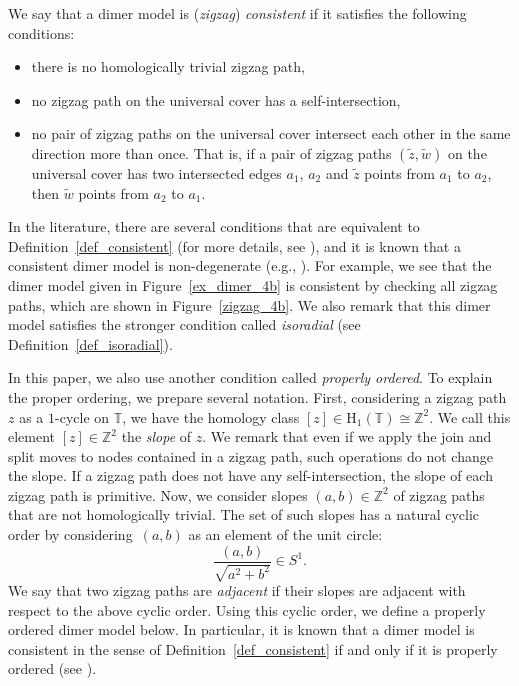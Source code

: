 \documentclass[pdftex]{sigma}%
\numberwithin{equation}{section}
\numberwithin{figure}{section}
\numberwithin{table}{section}
\newcommand{\ZZ}{\mathbb{Z}}
\newcommand{\TT}{\mathbb{T}}
\newcommand{\rmH}{\mathrm{H}}
\begin{document}
\begin{Definition}
\label{def_consistent}
We say that a dimer model is (\emph{zigzag}) \emph{consistent} if it satisfies the following conditions:
\begin{itemize}\itemsep=0pt
\item [(1)] there is no homologically trivial zigzag path,
\item [(2)] no zigzag path on the universal cover has a self-intersection,
\item [(3)] no pair of zigzag paths on the universal cover intersect each other in the same direction more than once.
That is, if a pair of zigzag paths $(\widetilde{z},\widetilde{w})$ on the universal cover has two intersected edges $a_1$, $a_2$
and $\widetilde{z}$ points from $a_1$ to $a_2$, then $\widetilde{w}$ points from $a_2$ to $a_1$.
\end{itemize}
\end{Definition}

In the literature, there are several conditions that are equivalent to Definition~\ref{def_consistent} (for more details, see \cite{Boc1,IU1}),
and it is known that a consistent dimer model is non-degenerate (e.g., \cite[Proposition~8.1]{IU2}).
For example, we see that the dimer model given in Figure~\ref{ex_dimer_4b} is consistent by checking all zigzag paths, which are shown in Figure~\ref{zigzag_4b}.
We also remark that this dimer model satisfies the stronger condition called \emph{isoradial} (see Definition~\ref{def_isoradial}).

In this paper, we also use another condition called \emph{properly ordered}.
To explain the proper ordering, we prepare several notation.
First, considering a zigzag path $z$ as a $1$-cycle on $\TT$, we have the homology class $[z]\in\rmH_1(\TT)\cong\ZZ^2$. We call this element $[z]\in\ZZ^2$ the \emph{slope} of $z$.
We remark that even if we apply the join and split moves to nodes contained in a zigzag path, such operations do not change the slope.
If a zigzag path does not have any self-intersection, the slope of each zigzag path is primitive.
Now, we consider slopes $(a,b)\in\ZZ^2$ of zigzag paths that are not homologically trivial.
The set of such slopes has a natural cyclic order by considering~$(a,b)$ as an element of the unit circle:
\begin{displaymath}
\frac{(a,b)}{\sqrt{a^2+b^2}}\in S^1.
\end{displaymath}
We say that two zigzag paths are \emph{adjacent} if their slopes are adjacent with respect to the above cyclic order.
Using this cyclic order, we define a properly ordered dimer model below.
In particular, it is known that a dimer model is consistent in the sense of Definition~\ref{def_consistent} if and only if it is properly ordered (see \cite[Proposition~4.4]{IU1}).
\end{document}
